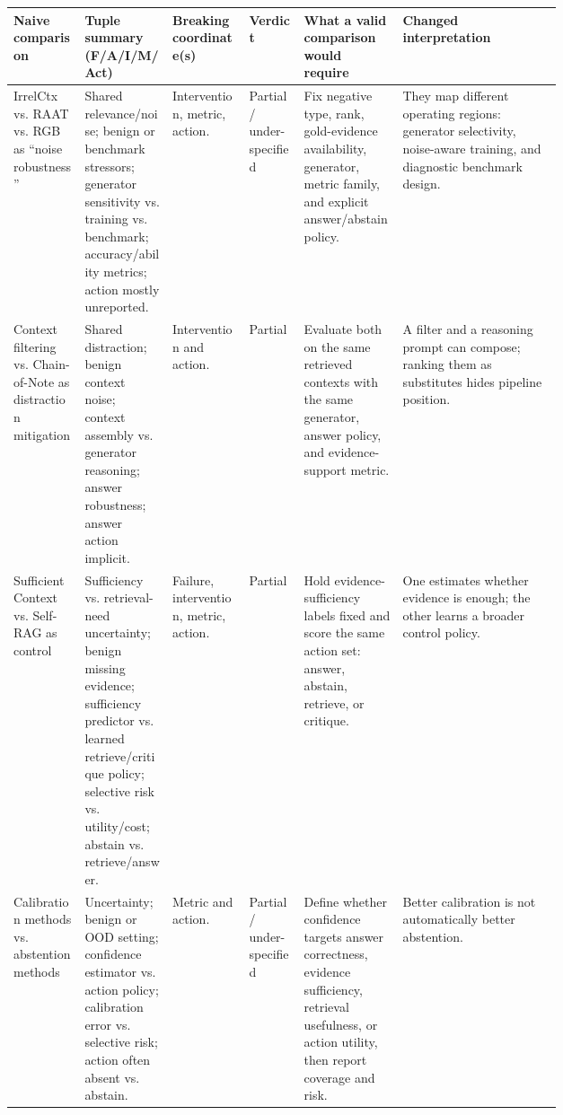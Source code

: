 \documentclass[11pt]{article}
\begin{document}

\begin{table}[t]
\centering
\tiny
\renewcommand{\arraystretch}{0.86}
\begin{tabularx}{\linewidth}{>{\raggedright\arraybackslash}p{0.13\linewidth}>{\raggedright\arraybackslash}p{0.16\linewidth}>{\raggedright\arraybackslash}p{0.14\linewidth}>{\raggedright\arraybackslash}p{0.10\linewidth}>{\raggedright\arraybackslash}p{0.18\linewidth}X}
\toprule
\textbf{Naive comparison} & \textbf{Tuple summary (F/A/I/M/Act)} & \textbf{Breaking coordinate(s)} & \textbf{Verdict} & \textbf{What a valid comparison would require} & \textbf{Changed interpretation} \\
\midrule
IrrelCtx vs. RAAT vs. RGB as ``noise robustness'' & Shared relevance/noise; benign or benchmark stressors; generator sensitivity vs. training vs. benchmark; accuracy/ability metrics; action mostly unreported. & Intervention, metric, action. & Partial / under-specified & Fix negative type, rank, gold-evidence availability, generator, metric family, and explicit answer/abstain policy. & They map different operating regions: generator selectivity, noise-aware training, and diagnostic benchmark design. \\
Context filtering vs. Chain-of-Note as distraction mitigation & Shared distraction; benign context noise; context assembly vs. generator reasoning; answer robustness; answer action implicit. & Intervention and action. & Partial & Evaluate both on the same retrieved contexts with the same generator, answer policy, and evidence-support metric. & A filter and a reasoning prompt can compose; ranking them as substitutes hides pipeline position. \\
Sufficient Context vs. Self-RAG as control & Sufficiency vs. retrieval-need uncertainty; benign missing evidence; sufficiency predictor vs. learned retrieve/critique policy; selective risk vs. utility/cost; abstain vs. retrieve/answer. & Failure, intervention, metric, action. & Partial & Hold evidence-sufficiency labels fixed and score the same action set: answer, abstain, retrieve, or critique. & One estimates whether evidence is enough; the other learns a broader control policy. \\
Calibration methods vs. abstention methods & Uncertainty; benign or OOD setting; confidence estimator vs. action policy; calibration error vs. selective risk; action often absent vs. abstain. & Metric and action. & Partial / under-specified & Define whether confidence targets answer correctness, evidence sufficiency, retrieval usefulness, or action utility, then report coverage and risk. & Better calibration is not automatically better abstention. \\

\end{tabularx}
\end{table}
\end{document}
